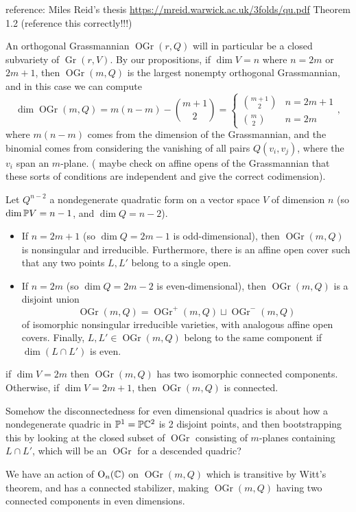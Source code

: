 \documentclass[12pt]{article}
\DeclareMathOperator{\OGr}{OGr}
\DeclareMathOperator{\Gr}{Gr}
\begin{document}
reference: Miles Reid's thesis \url{https://mreid.warwick.ac.uk/3folds/qu.pdf} Theorem 1.2 (reference this correctly!!!)

An orthogonal Grassmannian $\OGr(r,Q)$ will in particular be a closed subvariety of $\Gr(r,V)$. By our propositions, if $\dim V=n$ where $n = 2m$ or $2m+1$, then $\OGr(m,Q)$ is the largest nonempty orthogonal Grassmannian, and in this case we can compute
\[\dim \OGr(m,Q) = m(n-m) - \binom{m+1}{2} = \begin{cases}
    \binom{m+1}{2} & n=2m+1\\
    \binom{m}{2} & n=2m
\end{cases},\]
where $m(n-m)$ comes from the dimension of the Grassmannian, and the binomial comes from considering the vanishing of all pairs $Q(v_i,v_j)$, where the $v_i$ span an $m$-plane. ({\color{red} maybe check on affine opens of the Grassmannian that these sorts of conditions are independent and give the correct codimension}).

\begin{prop}
    Let $Q^{n-2}$ a nondegenerate quadratic form on a vector space $V$ of dimension $n$ (so $\dim \P V = n-1$, and $\dim Q = n-2$).
    \begin{itemize}
        \item If $n=2m+1$ (so $\dim Q = 2m-1$ is odd-dimensional), then $\OGr(m,Q)$ is nonsingular and irreducible. Furthermore, there is an affine open cover such that any two points $L,L'$ belong to a single open.
        \item If $n=2m$ (so $\dim Q = 2m-2$ is even-dimensional), then $\OGr(m,Q)$ is a disjoint union
        \[ \OGr(m,Q)= \OGr^+(m,Q) \sqcup \OGr^-(m,Q) \]
        of isomorphic nonsingular irreducible varieties, with analogous affine open covers. Finally, $L,L'\in \OGr(m,Q)$ belong to the same component if $\dim(L\cap L')$ is even.
    \end{itemize}
    if $\dim V = 2m$ then $\OGr(m,Q)$ has two isomorphic connected components. Otherwise, if $\dim V = 2m+1$, then $\OGr(m,Q)$ is connected.
\end{prop}

Somehow the disconnectedness for even dimensional quadrics is about how a nondegenerate quadric in $\P^1 = \P \C^2$ is 2 disjoint points, and then bootstrapping this by looking at the closed subset of $\OGr$ consisting of $m$-planes containing $L\cap L'$, which will be an $\OGr$ for a descended quadric?

We have an action of $\mathrm{O}_{n}(\C)$ on $\OGr(m,Q)$ which is transitive by {\color{red} Witt's theorem, and has a connected stabilizer, making $\OGr(m,Q)$ having two connected components in even dimensions.}
\end{document}
